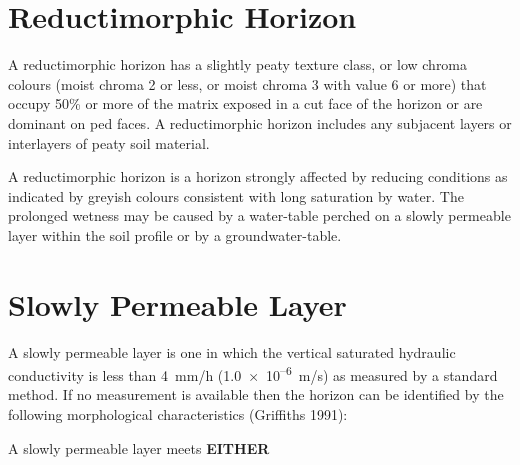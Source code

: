 \documentclass[
  letterpaper,
  DIV=11,
  numbers=noendperiod]{scrreprt}
\begin{document}
\hypertarget{sec-diag-redmh}{%
\section{Reductimorphic Horizon}\label{sec-diag-redmh}}

A reductimorphic horizon has a slightly peaty texture class, or low
chroma colours (moist chroma 2 or less, or moist chroma 3 with value 6
or more) that occupy 50\% or more of the matrix exposed in a cut face of
the horizon or are dominant on ped faces. A reductimorphic horizon
includes any subjacent layers or interlayers of peaty soil material.

A reductimorphic horizon is a horizon strongly affected by reducing
conditions as indicated by greyish colours consistent with long
saturation by water. The prolonged wetness may be caused by a
water-table perched on a slowly permeable layer within the soil profile
or by a groundwater-table.

\hypertarget{sec-diag-slowp}{%
\section{Slowly Permeable Layer}\label{sec-diag-slowp}}

A slowly permeable layer is one in which the vertical saturated
hydraulic conductivity is less than 4~mm/h
(1.0~×~10\textsuperscript{--6}~m/s) as measured by a standard method. If
no measurement is available then the horizon can be identified by the
following morphological characteristics (Griffiths 1991):

A slowly permeable layer meets \textbf{EITHER}
\end{document}
